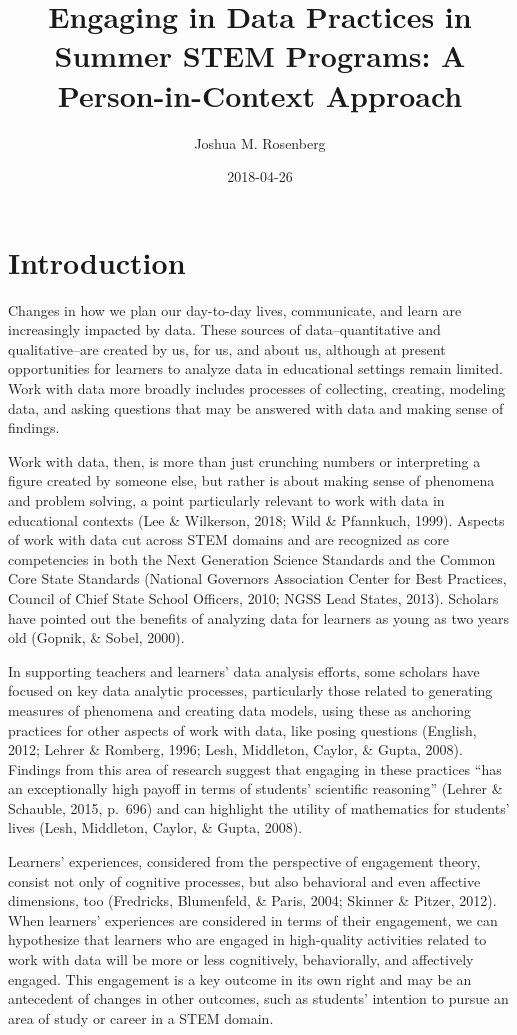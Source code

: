 \documentclass[]{book}
\title{Engaging in Data Practices in Summer STEM Programs: A Person-in-Context
Approach}
\author{Joshua M. Rosenberg}
\date{2018-04-26}
\theoremstyle{definition}
\theoremstyle{definition}
\theoremstyle{definition}
\theoremstyle{remark}
\begin{document}
\maketitle

{
\setcounter{tocdepth}{1}
\tableofcontents
}
\chapter{Introduction}\label{intro-placemarker}

Changes in how we plan our day-to-day lives, communicate, and learn are
increasingly impacted by data. These sources of data--quantitative and
qualitative--are created by us, for us, and about us, although at
present opportunities for learners to analyze data in educational
settings remain limited. Work with data more broadly includes processes
of collecting, creating, modeling data, and asking questions that may be
answered with data and making sense of findings.

Work with data, then, is more than just crunching numbers or
interpreting a figure created by someone else, but rather is about
making sense of phenomena and problem solving, a point particularly
relevant to work with data in educational contexts (Lee \& Wilkerson,
2018; Wild \& Pfannkuch, 1999). Aspects of work with data cut across
STEM domains and are recognized as core competencies in both the Next
Generation Science Standards and the Common Core State Standards
(National Governors Association Center for Best Practices, Council of
Chief State School Officers, 2010; NGSS Lead States, 2013). Scholars
have pointed out the benefits of analyzing data for learners as young as
two years old (Gopnik, \& Sobel, 2000).

In supporting teachers and learners' data analysis efforts, some
scholars have focused on key data analytic processes, particularly those
related to generating measures of phenomena and creating data models,
using these as anchoring practices for other aspects of work with data,
like posing questions (English, 2012; Lehrer \& Romberg, 1996; Lesh,
Middleton, Caylor, \& Gupta, 2008). Findings from this area of research
suggest that engaging in these practices ``has an exceptionally high
payoff in terms of students' scientific reasoning'' (Lehrer \& Schauble,
2015, p.~696) and can highlight the utility of mathematics for students'
lives (Lesh, Middleton, Caylor, \& Gupta, 2008).

Learners' experiences, considered from the perspective of engagement
theory, consist not only of cognitive processes, but also behavioral and
even affective dimensions, too (Fredricks, Blumenfeld, \& Paris, 2004;
Skinner \& Pitzer, 2012). When learners' experiences are considered in
terms of their engagement, we can hypothesize that learners who are
engaged in high-quality activities related to work with data will be
more or less cognitively, behaviorally, and affectively engaged. This
engagement is a key outcome in its own right and may be an antecedent of
changes in other outcomes, such as students' intention to pursue an area
of study or career in a STEM domain.
\end{document}

